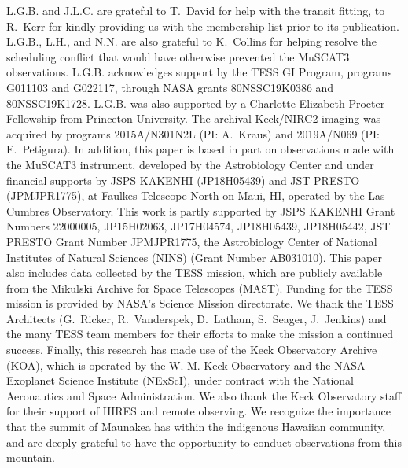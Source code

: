 \documentclass[12pt,modern,twocolumn,tighten]{aastex63}
\begin{document}


\acknowledgements
\raggedbottom

L.G.B{.} and J.L.C{.} are grateful to T{.}~David for help with the
transit fitting, to R{.}~Kerr for kindly providing us with the
\citet{Kerr2021} membership list prior to its publication.
L.G.B{.}, L.H{.}, and N.N{.} are also grateful to K{.}~Collins for
helping resolve the scheduling conflict that would have otherwise
prevented the MuSCAT3 observations.
%
L.G.B{.} acknowledges support by the TESS GI Program, programs
G011103 and G022117, through NASA grants 80NSSC19K0386 and
80NSSC19K1728.
%
L.G.B{.} was also supported by a Charlotte Elizabeth Procter
Fellowship from Princeton University.
%
The archival Keck/NIRC2 imaging was acquired by programs 2015A/N301N2L
(PI: A.~Kraus) and 2019A/N069 (PI: E.~Petigura).
%
In addition, this paper is based in part on observations made with the
MuSCAT3 instrument, developed by the Astrobiology Center and under
financial supports by JSPS KAKENHI (JP18H05439) and JST PRESTO
(JPMJPR1775), at Faulkes Telescope North on Maui, HI, operated by the
Las Cumbres Observatory.
%
This work is partly supported by JSPS KAKENHI Grant Numbers 22000005,
JP15H02063, JP17H04574, JP18H05439, JP18H05442, JST PRESTO Grant
Number JPMJPR1775, the Astrobiology Center of National Institutes of
Natural Sciences (NINS) (Grant Number AB031010).
%
%
This paper also includes data collected by the TESS mission, which are
publicly available from the Mikulski Archive for Space Telescopes
(MAST).
%
Funding for the TESS mission is provided by NASA's Science Mission
directorate.
%
We thank the TESS Architects (G.~Ricker, R.~Vanderspek, D.~Latham,
S.~Seager, J.~Jenkins) and the many TESS team members for their
efforts to make the mission a continued success.
%
%
%
%
Finally, this research has made use of the Keck Observatory Archive (KOA),
which is operated by the W. M. Keck Observatory and the NASA Exoplanet
Science Institute (NExScI), under contract with the National
Aeronautics and Space Administration.  We also thank the Keck
Observatory staff for their support of HIRES and remote observing.  We
recognize the importance that the summit of Maunakea has within the
indigenous Hawaiian community, and are deeply grateful to have the
opportunity to conduct observations from this mountain.
%
%
\end{document}
